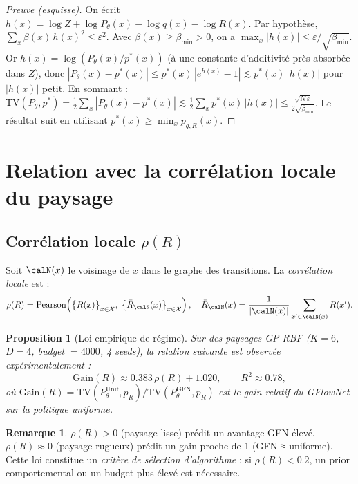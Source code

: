 \documentclass[11pt,a4paper]{article}
\theoremstyle{plain}
\newtheorem{proposition}[theorem]{Proposition}
\theoremstyle{definition}
\newtheorem{remark}[theorem]{Remarque}
\theoremstyle{remark}
\newcommand{\calX}{\mathcal{X}}
\newcommand{\logZ}{\log Z}
\newcommand{\pth}{P_\theta}
\newcommand{\pR}{p_R}
\newcommand{\TV}{\mathrm{TV}}
\begin{document}
\begin{proof}[Preuve (esquisse)]
On écrit $h(x) = \logZ + \log\pth(x) - \log q(x) - \log R(x)$.
Par hypothèse, $\sum_x \beta(x)\,h(x)^2 \leq \varepsilon^2$.
Avec $\beta(x) \geq \beta_{\min} > 0$, on a $\max_x |h(x)| \leq \varepsilon/\sqrt{\beta_{\min}}$.
Or $h(x) = \log(\pth(x)/p^*(x))$ (à une constante d'additivité près absorbée dans $Z$),
donc $|\pth(x) - p^*(x)| \leq p^*(x)\,|e^{h(x)} - 1| \lesssim p^*(x)\,|h(x)|$
pour $|h(x)|$ petit. En sommant :
$\TV(\pth, p^*) = \tfrac{1}{2}\sum_x |\pth(x) - p^*(x)|
\lesssim \tfrac{1}{2}\sum_x p^*(x)\,|h(x)|
\leq \tfrac{\sqrt{N\,\varepsilon}}{2\sqrt{\beta_{\min}}}$.
Le résultat suit en utilisant $p^*(x) \geq \min_x p_{q,R}(x)$.
\end{proof}

\section{Relation avec la corrélation locale du paysage}
\label{sec:landscape}

\subsection{Corrélation locale $\rho(R)$}

Soit $\calN(x)$ le voisinage de $x$ dans le graphe des transitions.
La \emph{corrélation locale} est :
\begin{equation}
  \rho(R) = \mathrm{Pearson}\!\left(
    \bigl\{R(x)\bigr\}_{x\in\calX},\;
    \bigl\{\bar{R}_{\calN}(x)\bigr\}_{x\in\calX}
  \right),
  \quad \bar{R}_{\calN}(x) = \frac{1}{|\calN(x)|}\sum_{x'\in\calN(x)} R(x').
\end{equation}

\begin{proposition}[Loi empirique de régime]
\label{prop:regime}
Sur des paysages GP-RBF ($K=6$, $D=4$, budget $= 4000$, 4 seeds),
la relation suivante est observée expérimentalement :
\begin{equation}
  \mathrm{Gain}(R) \approx 0.383\,\rho(R) + 1.020, \qquad R^2 \approx 0.78,
\end{equation}
où $\mathrm{Gain}(R) = \TV(\pth^{\mathrm{Unif}}, \pR) / \TV(\pth^{\mathrm{GFN}}, \pR)$
est le gain relatif du GFlowNet sur la politique uniforme.
\end{proposition}

\begin{remark}
$\rho(R) > 0$ (paysage lisse) prédit un avantage GFN élevé.
$\rho(R) \approx 0$ (paysage rugueux) prédit un gain proche de 1 (GFN ≈ uniforme).
Cette loi constitue un \emph{critère de sélection d'algorithme} : si $\rho(R) < 0.2$,
un prior comportemental ou un budget plus élevé est nécessaire.
\end{remark}
\end{document}
